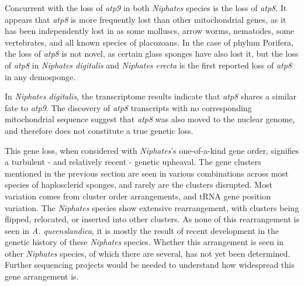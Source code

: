 \documentclass[../main.tex]{subfiles}
\begin{document}
Concurrent with the loss of \emph{atp9} in both \emph{Niphates} species is the loss of \emph{atp8}. It appears that \emph{atp8} is more frequently lost than other mitochondrial genes, as it has been independently lost in as some molluscs, arrow worms, nematodes, some vertebrates, and all known species of placozoans. In the case of phylum Porifera, the loss of \emph{atp8} is not novel, as certain glass sponges have also lost it, but the loss of \emph{atp8} in \emph{Niphates digitalis} and \emph{Niphates erecta} is the first reported loss of \emph{atp8} in any demosponge. 

In \emph{Niphates digitalis}, the transcriptome results indicate that \emph{atp8} shares a similar fate to \emph{atp9}. The discovery of \emph{atp8} transcripts with no corresponding mitochondrial sequence suggest that \emph{atp8} was also moved to the nuclear genome, and therefore does not constitute a true genetic loss. 

This gene loss, when considered with \emph{Niphates}'s one-of-a-kind gene order, signifies a turbulent - and relatively recent - genetic upheaval. The gene clusters mentioned in the previous section are seen in various combinations across most species of haplosclerid sponges, and rarely are the clusters disrupted. Most variation comes from cluster order arrangements, and tRNA gene position variation. The \emph{Niphates} species show extensive rearrangement, with clusters being flipped, relocated, or inserted into other clusters. As none of this rearrangement is seen in \emph{A. queenslandica}, it is mostly the result of recent development in the genetic history of these \emph{Niphates} species. Whether this arrangement is seen in other \emph{Niphates} species, of which there are several, has not yet been determined. Further sequencing projects would be needed to understand how widespread this gene arrangement is. 
\end{document}
